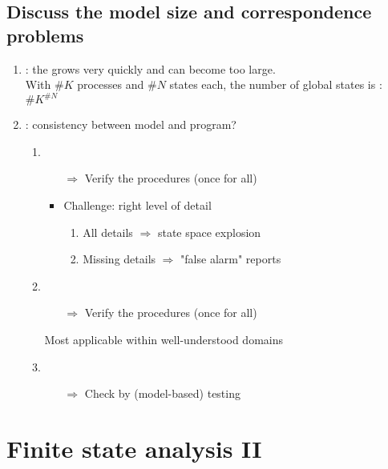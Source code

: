 \newpage
\section{Discuss the model size and correspondence problems}

\begin{enumerate}
    \item {} : the  grows very quickly and can become too large.\\
    With $\#K$ processes and $\#N$ states each, the number of global states is : $\#K^{\#N}$
    \item {} : consistency between model and program?
    \begin{enumerate}
        \item {}
        \begin{itemize}
            \item [$\Rightarrow$] Verify the  procedures (once for all)
            \item Challenge: right level of detail
            \begin{enumerate}
                \item All details $\Rightarrow$ state space explosion
                \item Missing details $\Rightarrow$ "false alarm" reports
            \end{enumerate}
        \end{itemize}
        \item {}
        \begin{itemize}
            \item [$\Rightarrow$] Verify the  procedures (once for all)
        \end{itemize}
        Most applicable within well-understood domains
        \item {}
        \begin{itemize}
            \item [$\Rightarrow$] Check  by (model-based) testing
        \end{itemize}
    \end{enumerate}
\end{enumerate}

\chapter{Finite state analysis II}

